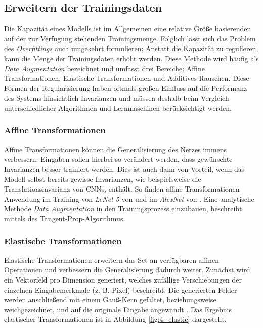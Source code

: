 \subsection{Erweitern der Trainingsdaten}
Die Kapazität eines Modells ist im Allgemeinen eine relative Größe basierenden auf der zur Verfügung stehenden Trainingsmenge. Folglich lässt sich das Problem des \textit{Overfittings} auch umgekehrt formulieren: Anstatt die Kapazität zu regulieren, kann die Menge der Trainingsdaten erhöht werden. Diese Methode wird häufig als \textit{Data Augmentation} bezeichnet und umfasst drei Bereiche: Affine Transformationen, Elastische Transformationen und Additives Rauschen. Diese Formen der Regularisierung haben oftmals großen Einfluss auf die Performanz des Systems hinsichtlich Invarianzen und müssen deshalb beim Vergleich unterschiedlicher Algorithmen und Lernmaschinen berücksichtigt werden.
\cite[vgl.][Kap. 7.5, S. 210 f.]{Bengio2015}



\subsubsection{Affine Transformationen}
Affine Transformationen können die Generalisierung des Netzes immens verbessern. Eingaben sollen hierbei so verändert werden, dass gewünschte Invarianzen besser trainiert werden. Dies ist auch dann von Vorteil, wenn das Modell selbst bereits gewisse Invarianzen, wie beispielsweise die Translationsinvarianz von CNNs, enthält. So finden affine Transformationen Anwendung im Training von \textit{LeNet 5} von \cite{LeCun1998} und im \textit{AlexNet} von \cite{Krizhevsky2012}.
Eine analytische Methode \textit{Data Augmentation} in den Trainingsprozess einzubauen, beschreibt \cite{Simard92} mittels des Tangent-Prop-Algorithmus.


\subsubsection{Elastische Transformationen}
Elastische Transformationen erweitern das Set an verfügbaren affinen Operationen und verbessern die Generalisierung dadurch weiter. 
Zunächst wird ein Vektorfeld pro Dimension generiert, welches zufällige Verschiebungen der einzelnen Eingabemerkmale (z. B. Pixel) beschreibt. Die generierten Felder werden anschließend mit einem Gauß-Kern gefaltet, beziehungsweise weichgezeichnet, und auf die originale Eingabe angewandt \cite[vgl.][]{Simard2003}.
Das Ergebnis elastischer Transformationen ist in Abbildung \ref{fig:4_elastic} dargestellt.

